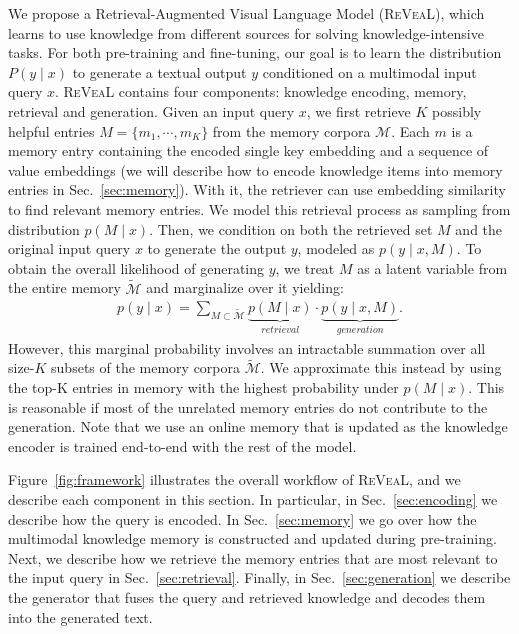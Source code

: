 \documentclass[10pt,twocolumn,letterpaper]{article}
\newcommand{\method}{R\textsc{e}V\textsc{ea}L\xspace}
\begin{document}
We propose a Retrieval-Augmented Visual Language Model (\method), which learns to use knowledge from different sources for solving knowledge-intensive tasks.
For both pre-training and fine-tuning, our goal is to learn the distribution $P(y \mid x)$ to generate a textual output $y$ conditioned on a multimodal input query $x$. \method contains four components: knowledge encoding, memory, retrieval and generation. 
Given an input query $x$, we first retrieve $K$ possibly helpful entries $M = \{m_1, \cdots, m_K\}$ from the memory corpora $\mathcal{M}$. Each $m$ is a memory entry containing the encoded single key embedding and a sequence of value embeddings (we will describe how to encode knowledge items into memory entries in Sec.~\ref{sec:memory}). With it, the retriever can use embedding similarity to find relevant memory entries.
We model this retrieval process as sampling from distribution $p(M \mid x)$. Then, we condition on both the retrieved set $M$ and the original input query $x$ to generate the output $y$, modeled as $p(y \mid x,M)$. To obtain the overall likelihood of generating $y$, we treat $M$ as a latent variable from the entire memory $\tilde{\mathcal{M}}$ and marginalize over it yielding:
\begin{align}
    p(y  \mid  x) = \sum_{M \subset \tilde{\mathcal{M}}}  \underbrace{p(M  \mid x)}_{retrieval} \cdot  \underbrace{p(y \mid  x, M)}_{generation}. \label{eq:main}
\end{align} 
However, this marginal probability involves an intractable summation over all size-$K$ subsets of the memory corpora $\tilde{\mathcal{M}}$. 
We approximate this instead by using the top-K entries in memory with the highest probability under $p(M \mid x)$. This is reasonable if most of the unrelated memory entries do not contribute to the generation. Note that we use an online memory that is updated as the knowledge encoder is trained end-to-end with the rest of the model.  



Figure~\ref{fig:framework} illustrates the overall workflow of \method, and we describe each component in this section. In particular, in Sec.~\ref{sec:encoding} we describe how the query is encoded. In Sec.~\ref{sec:memory} we go over how the multimodal knowledge memory is constructed and updated during pre-training. Next, we describe how we retrieve the memory entries that are most relevant to the input query in Sec.~\ref{sec:retrieval}. Finally, in Sec.~\ref{sec:generation} we describe the generator that fuses the query and retrieved knowledge and decodes them into the generated text.
\end{document}
